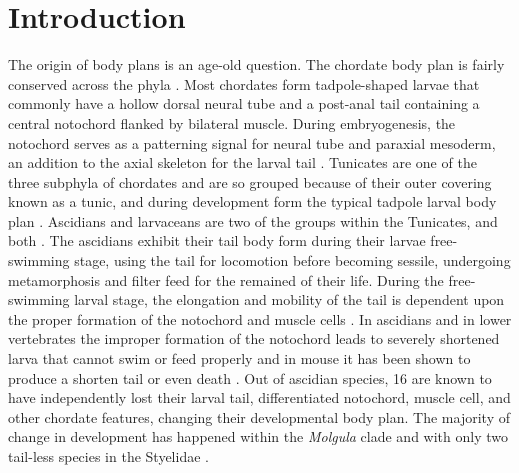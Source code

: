 \chapter{Introduction}
The origin of body plans is an age-old question. The chordate body plan is fairly conserved across the phyla \cite{nishida_cell_2014}. Most chordates form tadpole-shaped larvae that commonly have a hollow dorsal neural tube and a post-anal tail containing a central notochord flanked by bilateral muscle. During embryogenesis, the notochord serves as a patterning signal for neural tube and paraxial mesoderm, an addition to the axial skeleton for the larval tail \cite{jeffery_evolution_1999,stemple_structure_2005}. Tunicates are one of the three subphyla of chordates and are so grouped because of their outer covering known as a tunic, and during development form the typical tadpole larval body plan \cite{huber_evolution_2000}. Ascidians and larvaceans are two of the groups within the Tunicates, and both . The ascidians exhibit their tail body form during their larvae free-swimming stage, using the tail for locomotion  before becoming sessile, undergoing metamorphosis and filter feed for the remained of their life. During the free-swimming larval stage, the elongation and mobility of the tail is dependent upon the proper formation of the notochord and muscle cells \cite{satoh_ascidian_2003}. In ascidians and in lower vertebrates the improper formation of the notochord leads to severely shortened larva that cannot swim or feed properly \cite{di_gregorio_tail_2002,jiang_ascidian_2005,stemple_structure_2005} and in mouse it has been shown to produce a shorten tail or even death \cite{herrmann_t_1994}. Out of   ascidian species, 16 are known to have independently lost their larval tail, differentiated notochord, muscle cell, and other chordate features, changing their developmental body plan. The majority of change in development has happened within the \textit{Molgula} clade \cite{berrill_studies_1931,swalla_interspecific_1990} and with only two tail-less species in the Styelidae \cite{huber_evolution_2000}. 

